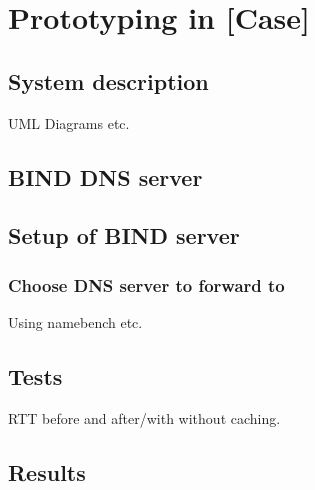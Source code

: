 \chapter{Prototyping in [Case]}
\section{System description}
UML Diagrams etc.

\section{BIND DNS server}

\section{Setup of BIND server}
\subsection{Choose DNS server to forward to}
Using namebench etc.

\section{Tests}
RTT before and after/with without caching.

\section{Results}




